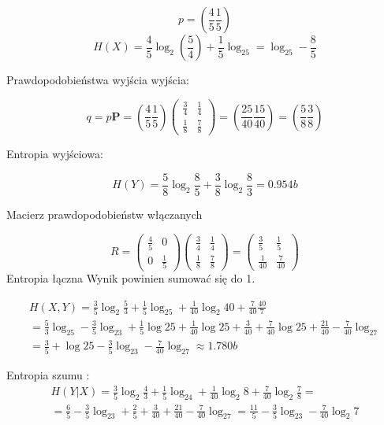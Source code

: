 \documentclass[12pt]{article}
\begin{document}
$$p=\left( \frac{4}{5} \frac{1}{5}  \right) $$
$$H(X) = \frac{4}{5}\log_2(\frac{5}{4}) + \frac{1}{5} \log_25 = \log_25 - \frac{8}{5}  $$

Prawdopodobieństwa wyjścia wyjścia:

$$q = p\mathbf{P} = (\frac{4}{5} \frac{1}{5} )   
\begin{pmatrix}
    \frac{3}{4} & \frac{1}{4} \\
    \frac{1}{8} & \frac{7}{8} 
\end{pmatrix}
= \left( \frac{25}{40} \frac{15}{40}  \right) 
= \left( \frac{5}{8} \frac{3}{8}  \right) 
$$

Entropia wyjściowa:

$$H(Y) = \frac{5}{8}\log_2\frac{8}{5} + \frac{3}{8}\log_2\frac{8}{3} = 0.954b $$

Macierz prawdopodobieństw włączanych 

$$ R =
\begin{pmatrix}
    \frac{4}{5} & 0 \\
    0 & \frac{1}{5} 
\end{pmatrix}
\begin{pmatrix}
    \frac{3}{4} & \frac{1}{4} \\
    \frac{1}{8} & \frac{7}{8} 
\end{pmatrix}=
\begin{pmatrix}
    \frac{3}{5} & \frac{1}{5} \\
    \frac{1}{40} & \frac{7}{40} 
\end{pmatrix}
$$
Entropia łączna
Wynik powinien sumować się do 1. 

\begin{multline*}
    H(X,Y)= \frac{3}{5}\log_2\frac{5}{3} + \frac{1}{5}\log_25 + \frac{1}{40}\log_2 40 + \frac{7}{40}\frac{40}{7}\\
    = \frac{5}{3}\log_25 - \frac{3}{5}\log_23+\frac{1}{5}\log25+\frac{1}{40}\log25+\frac{3}{40}+\frac{7}{40}\log25+\frac{21}{40}
    -\frac{7}{40}\log_27 \\
    = \frac{3}{5} + \log25 - \frac{3}{5}\log_23 - \frac{7}{40}\log_27 \approx 1.780 b
\end{multline*}

Entropia szumu :
\begin{multline*}
    H(Y|X) = \frac{3}{5}\log_2 \frac{4}{3} + \frac{1}{5}\log_24 + \frac{1}{40}\log_2{8} + \frac{7}{40}\log_2 \frac{7}{8}=\\
    = \frac{6}{5} - \frac{3}{5}\log_23 + \frac{2}{5} + \frac{3}{40} + \frac{21}{40} - \frac{7}{40}\log_27 = 
    \frac{11}{5} - \frac{3}{5}\log_23 - \frac{7}{40}\log_2 7
\end{multline*}
\end{document}
